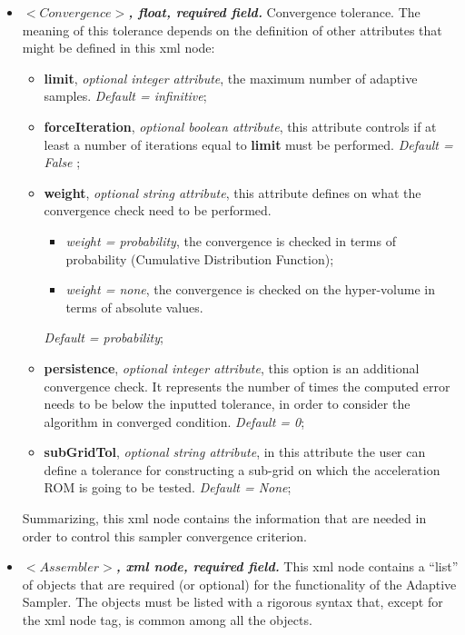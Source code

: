 \begin{itemize}
  \item $<Convergence>$\textbf{\textit{, float, required field.}} Convergence tolerance. The meaning of this tolerance depends on the definition of other attributes that might be defined in this xml node:
     \begin{itemize}
         \item \textbf{limit}, \textit{optional integer attribute}, the maximum number of adaptive samples. \textit{Default = infinitive};
         \item \textbf{forceIteration}, \textit{optional boolean attribute}, this attribute controls if at least a number of iterations equal to \textbf{limit} must be performed.  \textit{Default = False} ;
         \item \textbf{weight}, \textit{optional string attribute}, this attribute defines on what the convergence check need to be performed.
          \begin{itemize}
             \item \textit{weight = probability}, the convergence is checked in terms of probability (Cumulative Distribution Function);
             \item \textit{weight = none}, the convergence is checked on the hyper-volume in terms of absolute values.
          \end{itemize} 
          \textit{Default = probability};
         \item \textbf{persistence}, \textit{optional integer attribute}, this option is an additional convergence check. It represents the number of times the computed error needs to be below the inputted tolerance, in order to consider the algorithm in converged condition.  \textit{Default = 0};
         \item \textbf{subGridTol}, \textit{optional string attribute}, in this attribute the user can define a tolerance for constructing a sub-grid on which the acceleration ROM is going to be tested. \textit{Default = None};
      \end{itemize}   
   Summarizing,  this xml node contains the information that are needed in order to control this sampler convergence criterion.
   \item $<Assembler>$\textbf{\textit{, xml node, required field.}} This xml node contains a ``list'' of objects that are required (or optional) for the functionality of the Adaptive Sampler. The objects must be listed with a rigorous syntax that, except for the xml node tag, is common among all the objects.  

\end{itemize}
